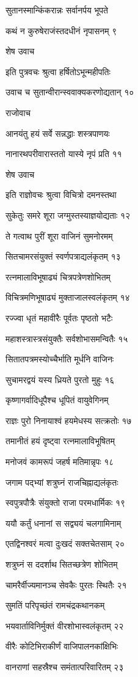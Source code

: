 सुतानस्मान्किंकरान्नः सर्वानर्पय भूपते

कथं न कुरुषेराजंस्तदधीनं नृपासनम् ९

शेष उवाच

इति पुत्रवचः श्रुत्वा हर्षितोऽभून्महीपतिः

उवाच च सुतान्वीरान्स्ववाक्यकरणोद्यतान् १०

राजोवाच

आनयंतु हयं सर्वे सन्नद्धाः शस्त्रपाणयः

नानारथपरीवारास्ततो यास्ये नृपं प्रति ११

शेष उवाच

इति राज्ञोवचः श्रुत्वा विचित्रो दमनस्तथा

सुकेतुः समरे शूरा जग्मुस्तस्याज्ञयोद्यताः १२

ते गत्वाथ पुरीं शूरा वाजिनं सुमनोरमम्

सितचामरसंयुक्तं स्वर्णपत्राद्यलंकृतम् १३

रत्नमालाविभूषाढ्यं चित्रपत्रेणशोभितम्

विचित्रमणिभूषाढ्यं मुक्ताजालस्वलंकृतम् १४

रज्ज्वा धृतं महावीरैः पूर्वतः पृष्ठतो भटैः

महाशस्त्रास्त्रसंयुक्तैः सर्वशोभासमन्वितैः १५

सितातपत्रमस्योच्चैर्भाति मूर्धनि वाजिनः

सुचामरद्वयं यस्य ध्रियते पुरतो मुहुः १६

कृष्णागर्वादिधूपैश्च धूपितं वायुवेगिनम्

राज्ञः पुरो निनायाश्वं हयमेधस्य सत्क्रतोः १७

तमानीतं हयं दृष्ट्वा रत्नमालाविभूषितम्

मनोजवं कामरूपं जहर्ष मतिमान्नृपः १८

जगाम पद्भ्यां शत्रुघ्नं राजचिह्नाद्यलंकृतः

स्वपुत्रपौत्रैः संयुक्तो राजा परमधार्मिकः १९

ययौ कर्तुं धनानां स सद्व्ययं चलगामिनाम्

एतद्विनश्वरं मत्वा दुःखदं सक्तचेतसाम् २०

शत्रुघ्नं स ददर्शाथ सितच्छत्रेण शोभितम्

चामरैर्वीज्यमानञ्च सेवकैः पुरतः स्थितैः २१

सुमतिं परिपृच्छंतं रामचंद्रकथानकम्

भयवार्ताविनिर्मुक्तं वीरशोभास्वलंकृतम् २२

वीरैः कोटिभिराकीर्णं वाजिपालनकांक्षिभिः

वानराणां सहस्रैश्च समंतात्परिवारितम् २३

